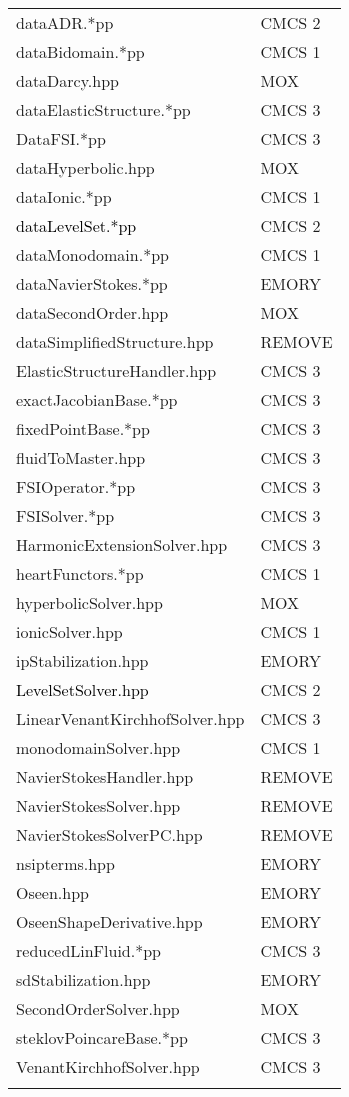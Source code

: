 \documentclass[10p]{article}
\newcommand{\newparts}[1]{\textcolor{black}{#1}}
\theoremstyle{definition}
\begin{document}
\begin{landscape}
\begin{table}[!h]
\begin{multicols}{4}
\begin{xtabular}{
p{0.28\textwidth}<{}|
p{0.1\textwidth}<{}
}
dataADR.*pp & CMCS 2\\
dataBidomain.*pp & CMCS 1\\
dataDarcy.hpp & MOX\\
dataElasticStructure.*pp & CMCS 3\\
DataFSI.*pp & CMCS 3\\
dataHyperbolic.hpp & MOX\\
dataIonic.*pp & CMCS 1\\
\newparts{dataLevelSet.*pp} & CMCS 2\\
dataMonodomain.*pp & CMCS 1\\
dataNavierStokes.*pp & EMORY\\
dataSecondOrder.hpp & MOX\\
dataSimplifiedStructure.hpp & REMOVE\\
ElasticStructureHandler.hpp & CMCS 3\\
exactJacobianBase.*pp & CMCS 3\\
fixedPointBase.*pp & CMCS 3\\
fluidToMaster.hpp & CMCS 3\\
FSIOperator.*pp & CMCS 3\\
FSISolver.*pp & CMCS 3\\
HarmonicExtensionSolver.hpp & CMCS 3\\
heartFunctors.*pp & CMCS 1\\
hyperbolicSolver.hpp & MOX\\
ionicSolver.hpp & CMCS 1\\
ipStabilization.hpp & EMORY\\
\newparts{LevelSetSolver.hpp} & CMCS 2\\
LinearVenantKirchhofSolver.hpp & CMCS 3\\
monodomainSolver.hpp & CMCS 1\\
NavierStokesHandler.hpp & REMOVE\\
NavierStokesSolver.hpp & REMOVE\\
NavierStokesSolverPC.hpp & REMOVE\\
nsipterms.hpp & EMORY\\
Oseen.hpp & EMORY\\
OseenShapeDerivative.hpp & EMORY\\
reducedLinFluid.*pp & CMCS 3\\
sdStabilization.hpp & EMORY\\
SecondOrderSolver.hpp & MOX\\
steklovPoincareBase.*pp & CMCS 3\\
VenantKirchhofSolver.hpp & CMCS 3\\
& \\
\end{xtabular}

\end{multicols}
\normalsize\selectfont
\end{table}
\end{landscape}
\end{document}
